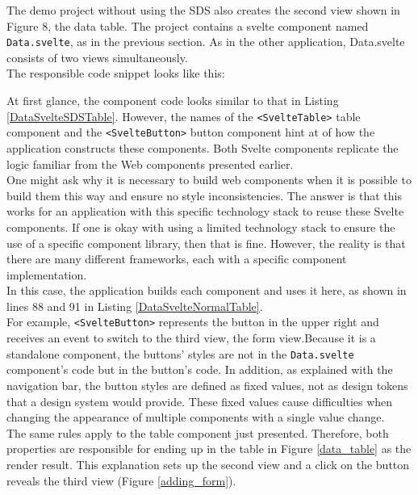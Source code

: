 The demo project without using the SDS also creates the second view shown in Figure 8, the data table. The project contains a svelte component named \texttt{Data.svelte}, as in the previous section. As in the other application, Data.svelte consists of two views simultaneously. \\
The responsible code snippet looks like this:

At first glance, the component code looks similar to that in Listing \ref{DataSvelteSDSTable}. However, the names of the \texttt{<SvelteTable>} table component and the \texttt{<SvelteButton>} button component hint at of how the application constructs these components. Both Svelte components replicate the logic familiar from the Web components presented earlier. \\
One might ask why it is necessary to build web components when it is possible to build them this way and ensure no style inconsistencies. The answer is that this works for an application with this specific technology stack to reuse these Svelte components. If one is okay with using a limited technology stack to ensure the use of a specific component library, then that is fine. However, the reality is that there are many different frameworks, each with a specific component implementation.\\
In this case, the application builds each component and uses it here, as shown in lines 88 and 91 in Listing \ref{DataSvelteNormalTable}. \\
For example, \texttt{<SvelteButton>} represents the button in the upper right and receives an event to switch to the third view, the form view.Because it is a standalone component, the buttons' styles are not in the \texttt{Data.svelte} component's code but in the button's code. In addition, as explained with the navigation bar, the button styles are defined as fixed values, not as design tokens that a design system would provide. These fixed values cause difficulties when changing the appearance of multiple components with a single value change. \\
The same rules apply to the table component just presented. Therefore, both properties are responsible for ending up in the table in Figure \ref{data_table} as the render result. This explanation sets up the second view and a click on the button reveals the third view (Figure \ref{adding_form}). \\


